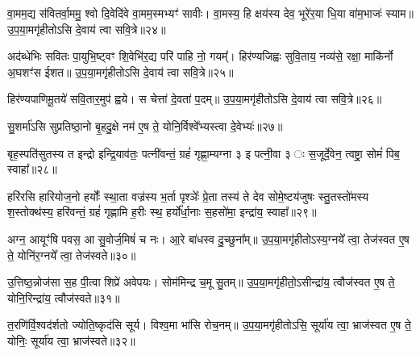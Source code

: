 वा॒मम॒द्य स॑वितर्वा॒ममु॒ श्वो दि॒वेदि॑वे वा॒मम॒स्मभ्यꣳ॑ सावीः। वा॒मस्य॒ हि क्षय॑स्य देव॒ भूरे॑र॒या धि॒या वा॑म॒भाजः॑ स्याम॥ उ॒प॒या॒मगृ॑हीतो\-ऽसि दे॒वाय॑ त्वा सवि॒त्रे॥२४॥

{\anuvakamend[{वा॒मं चतु॑र्विꣳशतिः॥23॥}]}

अद॑ब्धेभिः सवितः पा॒युभि॒ष्ट्वꣳ शि॒वेभि॑र॒द्य परि॑ पाहि नो॒ गयम्᳚। हिर॑ण्यजिह्वः सुवि॒ताय॒ नव्य॑से॒ रक्षा॒ माकि॑र्नो अ॒घशꣳ॑स ईशत॥ उ॒प॒या॒मगृ॑हीतो\-ऽसि दे॒वाय॑ त्वा सवि॒त्रे॥२५॥

{\anuvakamend[{अद॑ब्धेभि॒स्त्रयो॑विꣳशतिः॥24॥}]}

हिर॑ण्यपाणिमू॒तये॑ सवि॒तार॒मुप॑ ह्वये। स चेत्ता॑ दे॒वता॑ प॒दम्॥ उ॒प॒या॒मगृ॑हीतो\-ऽसि दे॒वाय॑ त्वा सवि॒त्रे॥२६॥

{\anuvakamend[{हिर॑ण्यपाणिं॒ चतु॑र्दश॥25॥}]}

सु॒शर्मा॑\-ऽसि सुप्रतिष्ठा॒नो बृ॒हदु॒क्षे नम॑ ए॒ष ते॒ योनि॒र्विश्वे᳚भ्यस्त्वा दे॒वेभ्यः॑॥२७॥

{\anuvakamend[{सु॒शर्मा॒ द्वाद॑श॥26॥}]}

बृह॒स्पति॑सुतस्य त इन्द्रो इन्द्रि॒याव॑तः॒ पत्नी॑वन्तं॒ ग्रहं॑ गृह्णा॒म्यग्ना ३ इ पत्नी॒वा ३ ः स॒जूर्दे॒वेन॒ त्वष्ट्रा॒ सोमं॑ पिब॒ स्वाहा᳚॥२८॥

{\anuvakamend[{बृह॒स्पति॑सुतस्य॒ पञ्च॑दश॥27॥}]}

हरि॑रसि हारियोज॒नो हर्योः᳚ स्था॒ता वज्र॑स्य भ॒र्ता पृश्ञेः᳚ प्रे॒ता तस्य॑ ते देव सोमे॒ष्टय॑जुषः स्तु॒तस्तो॑मस्य श॒स्तोक्थ॑स्य॒ हरि॑वन्तं॒ ग्रहं॑ गृह्णामि ह॒रीः स्थ॒ हर्यो᳚र्धा॒नाः स॒हसो॑मा॒ इन्द्रा॑य॒ स्वाहा᳚॥२९॥

{\anuvakamend[{हरिः॒ षड्विꣳ॑शतिः॥28॥}]}

अग्न॒ आयूꣳ॑षि पवस॒ आ सु॒वोर्ज॒मिषं॑ च नः। आ॒रे बा॑धस्व दु॒च्छुना᳚म्॥ उ॒प॒या॒मगृ॑हीतो\-ऽस्य॒ग्नये᳚ त्वा॒ तेज॑स्वत ए॒ष ते॒ योनि॑र॒ग्नये᳚ त्वा॒ तेज॑स्वते॥३०॥

{\anuvakamend[{अग्न॒ आयूꣳ॑षि॒ त्रयो॑वि ꣳशतिः॥29॥}]}

उ॒त्तिष्ठ॒न्नोज॑सा स॒ह पी॒त्वा शिप्रे॑ अवेपयः। सोम॑मिन्द्र च॒मू सु॒तम्॥ उ॒प॒या॒मगृ॑हीतो॒\-ऽसीन्द्रा॑य॒ त्वौज॑स्वत ए॒ष ते॒ योनि॒रिन्द्रा॑य॒ त्वौज॑स्वते॥३१॥

{\anuvakamend[{उ॒त्तिष्ठ॒न्नेक॑विꣳशतिः॥30॥}]}

त॒रणि॑र्वि॒श्वद॑र्\mbox{}शतो ज्योति॒ष्कृद॑सि सूर्य। विश्व॒मा भा॑सि रोच॒नम्॥ उ॒प॒या॒मगृ॑हीतो\-ऽसि॒ सूर्या॑य त्वा॒ भ्राज॑स्वत ए॒ष ते॒ योनिः॒ सूर्या॑य त्वा॒ भ्राज॑स्वते॥३२॥

